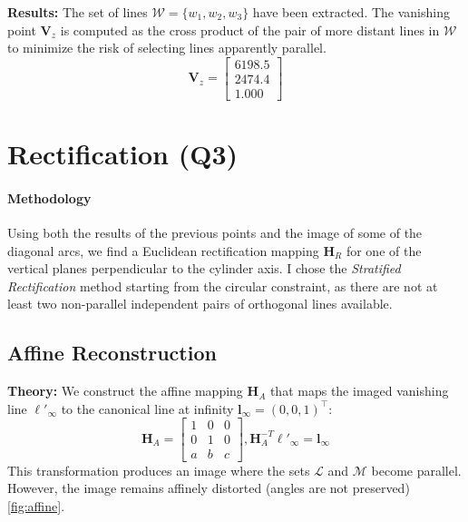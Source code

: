 \documentclass[a4paper,11pt]{article}
\newcommand{\matr}[1]{\bm{#1}}     %
\newcommand{\vect}[1]{\mathbf{#1}}  %
\begin{document}
\textbf{Results:} The set of lines $\mathcal{W} = \{w_1, w_2, w_3\}$ have been extracted. The vanishing point $\vect{V}_z$ is computed as the cross product of the pair of more distant lines in $\mathcal{W}$ to minimize the risk of selecting lines apparently parallel.
\begin{equation}
    \vect{V}_z = 
    \begin{bmatrix}
       6198.5 \\
    2474.4 \\
    1.000 
    \end{bmatrix}
\end{equation}

\section{Rectification (Q3)}

\paragraph{Methodology}
Using both the results of the previous points and the image of some of the diagonal arcs, we find a Euclidean rectification mapping $\matr{H}_R$ for one of the vertical planes perpendicular to the cylinder axis. I chose the \textit{Stratified Rectification} method starting from the circular constraint, as there are not at least two non-parallel independent pairs of orthogonal lines available.

\subsection{Affine Reconstruction}
\textbf{Theory:} We construct the affine mapping $\matr{H}_A$  that maps the imaged vanishing line $\ell'_\infty$ to the canonical line at infinity $\mathbf{l}_\infty = (0,0,1)^\top$:
\begin{equation}
    \matr{H}_A = 
    \begin{bmatrix}
        1 & 0 & 0 \\
        0 & 1 & 0 \\
        a & b & c
    \end{bmatrix}, 
    \matr{H}_A^{-T}\ell'_{\infty} = \mathbf{l}_\infty
\end{equation}
This transformation produces an image where the sets $\mathcal{L}$ and $\mathcal{M}$ become parallel. However, the image remains affinely distorted (angles are not preserved) \ref{fig:affine}.
\end{document}
